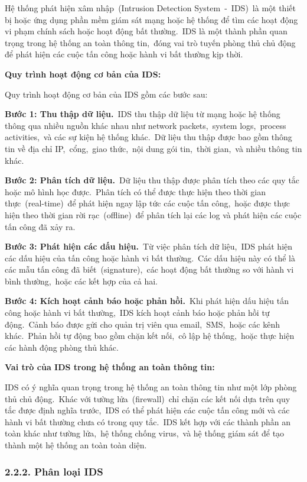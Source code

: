 Hệ thống phát hiện xâm nhập~(Intrusion Detection System~-~IDS)~là một thiết bị hoặc ứng dụng phần mềm giám sát mạng hoặc hệ thống để tìm các hoạt động vi phạm chính sách hoặc hoạt động bất thường.~IDS là một thành phần quan trọng trong hệ thống an toàn thông tin,~đóng vai trò tuyến phòng thủ chủ động để phát hiện các cuộc tấn công hoặc hành vi bất thường kịp thời.

\textbf{Quy trình hoạt động cơ bản của IDS:}

Quy trình hoạt động cơ bản của IDS gồm các bước sau:

\textbf{Bước 1: Thu thập dữ liệu.}~IDS thu thập dữ liệu từ mạng hoặc hệ thống thông qua nhiều nguồn khác nhau như network packets,~system logs,~process activities,~và các sự kiện hệ thống khác.~Dữ liệu thu thập được bao gồm thông tin về địa chỉ IP,~cổng,~giao thức,~nội dung gói tin,~thời gian,~và nhiều thông tin khác.

\textbf{Bước 2: Phân tích dữ liệu.}~Dữ liệu thu thập được phân tích theo các quy tắc hoặc mô hình học được.~Phân tích có thể được thực hiện theo thời gian thực~(real-time)~để phát hiện ngay lập tức các cuộc tấn công,~hoặc được thực hiện theo thời gian rời rạc~(offline)~để phân tích lại các log và phát hiện các cuộc tấn công đã xảy ra.

\textbf{Bước 3: Phát hiện các dấu hiệu.}~Từ việc phân tích dữ liệu,~IDS phát hiện các dấu hiệu của tấn công hoặc hành vi bất thường.~Các dấu hiệu này có thể là các mẫu tấn công đã biết~(signature),~các hoạt động bất thường so với hành vi bình thường,~hoặc các kết hợp của cả hai.

\textbf{Bước 4: Kích hoạt cảnh báo hoặc phản hồi.}~Khi phát hiện dấu hiệu tấn công hoặc hành vi bất thường,~IDS kích hoạt cảnh báo hoặc phản hồi tự động.~Cảnh báo được gửi cho quản trị viên qua email,~SMS,~hoặc các kênh khác.~Phản hồi tự động bao gồm chặn kết nối,~cô lập hệ thống,~hoặc thực hiện các hành động phòng thủ khác.

\textbf{Vai trò của IDS trong hệ thống an toàn thông tin:}

IDS có ý nghĩa quan trọng trong hệ thống an toàn thông tin như một lớp phòng thủ chủ động.~Khác với tường lửa~(firewall)~chỉ chặn các kết nối dựa trên quy tắc được định nghĩa trước,~IDS có thể phát hiện các cuộc tấn công mới và các hành vi bất thường chưa có trong quy tắc.~IDS kết hợp với các thành phần an toàn khác như tường lửa,~hệ thống chống virus,~và hệ thống giám sát để tạo thành một hệ thống an toàn toàn diện.

\subsubsection{2.2.2. Phân loại IDS}\label{phuxe2n-loux1ea1i-ids}

